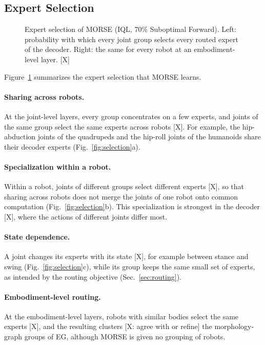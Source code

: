 \subsection{Expert Selection}
\label{sec:analysis}

\begin{figure}[t]
\centering
\fbox{\rule{0pt}{1.3in}\rule{0.95\linewidth}{0pt}}
\caption{Expert selection of MORSE (IQL, 70\% Suboptimal Forward). Left: probability with which every joint group
selects every routed expert of the decoder. Right: the same for every robot at an embodiment-level layer. [X]}
\label{fig:sharing}
\end{figure}

Figure~\ref{fig:sharing} summarizes the expert selection that MORSE learns.

\paragraph{Sharing across robots.}
At the joint-level layers, every group concentrates on a few experts, and joints of the same group select the same
experts across robots [X]. For example, the hip-abduction joints of the quadrupeds and the hip-roll joints of the
humanoids share their decoder experts (Fig.~\ref{fig:selection}a).

\paragraph{Specialization within a robot.}
Within a robot, joints of different groups select different experts [X], so that sharing across robots does not merge
the joints of one robot onto common computation (Fig.~\ref{fig:selection}b). This specialization is strongest in the
decoder [X], where the actions of different joints differ most.

\paragraph{State dependence.}
A joint changes its experts with its state [X], for example between stance and swing (Fig.~\ref{fig:selection}c),
while its group keeps the same small set of experts, as intended by the routing objective (Sec.~\ref{sec:routing}).

\paragraph{Embodiment-level routing.}
At the embodiment-level layers, robots with similar bodies select the same experts [X], and the resulting clusters [X:
agree with or refine] the morphology-graph groups of EG, although MORSE is given no grouping of robots.

